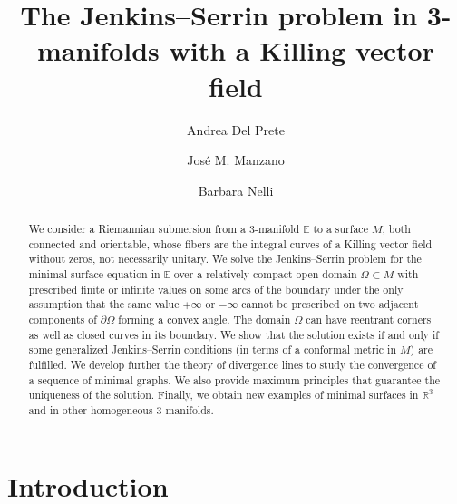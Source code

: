\documentclass[a4paper,10pt,reqno]{amsart}
\title{The Jenkins--Serrin problem in 3-manifolds with a Killing vector field}
\date{}
\author{Andrea Del Prete}
\author{Jos\'{e} M. Manzano}
\author{Barbara Nelli}
\newcommand{\E}{\mathbb{E}}
\theoremstyle{definition}
\theoremstyle{remark}
\numberwithin{equation}{section}
\begin{document}
	
\begin{abstract}
We consider a Riemannian submersion from a 3-manifold $\E$ to a surface $M$, both connected and orientable, whose fibers are the integral curves of a Killing vector field without zeros, not necessarily unitary. We solve the Jenkins--Serrin problem for the minimal surface equation in $\mathbb{E}$ over a relatively compact open domain $\Omega\subset M$ with prescribed finite or infinite values on some arcs of the boundary under the only assumption that the same value $+\infty$ or $-\infty$ cannot be prescribed on two adjacent components of $\partial\Omega$ forming a convex angle. The domain $\Omega$ can have reentrant corners as well as closed curves in its boundary. We show that the solution exists if and only if some generalized Jenkins--Serrin conditions (in terms of a conformal metric in $M$) are fulfilled. We develop further the theory of divergence lines to study the convergence of a sequence of minimal graphs. We also provide maximum principles that guarantee the uniqueness of the solution. Finally, we obtain new examples of minimal surfaces in $\mathbb{R}^3$ and in other homogeneous $3$-manifolds.
\end{abstract}

\maketitle
	
\section{Introduction}
	
\end{document}
